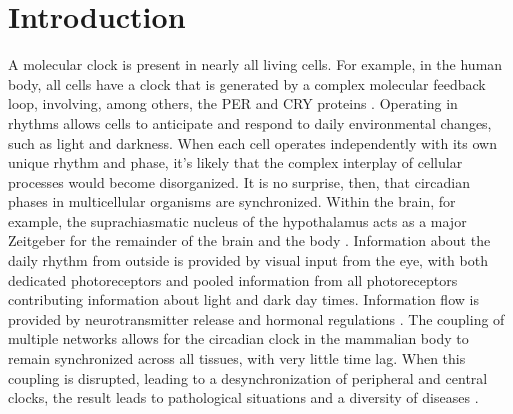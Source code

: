 \documentclass{article}
\begin{document}

\section{Introduction}
A molecular clock is present in nearly all living cells. For example, in the human body, all cells have a clock that is generated by a complex molecular feedback loop, involving, among others, the PER and CRY proteins \cite{takahashi_transcriptional_2017}. Operating in rhythms allows cells to anticipate and respond to daily environmental changes, such as light and darkness. When each cell operates independently with its own unique rhythm and phase, it's likely that the complex interplay of cellular processes would become disorganized. It is no surprise, then, that circadian phases in multicellular organisms are synchronized. Within the brain, for example, the suprachiasmatic nucleus of the hypothalamus acts as a major Zeitgeber for the remainder of the brain and the body \cite{finger_coupled_2020}. Information about the daily rhythm from outside is provided by visual input from the eye, with both dedicated photoreceptors\cite{berson_phototransduction_2002} and pooled information from all photoreceptors contributing information about light and dark day times. Information flow is provided by neurotransmitter release and hormonal regulations \cite{finger_coupled_2020}. The coupling of multiple networks allows for the circadian clock in the mammalian body to remain synchronized across all tissues, with very little time lag. When this coupling is disrupted, leading to a desynchronization of peripheral and central clocks, the result leads to pathological situations and a diversity of diseases \cite{finger_coupled_2020}.
  
\end{document}
